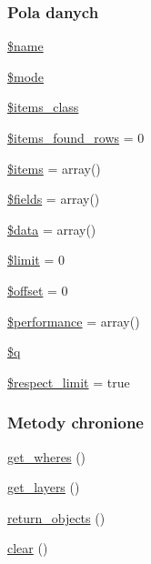 \subsubsection*{Pola danych}
\begin{DoxyCompactItemize}
\item 
\hyperlink{classep___dataset_ab2fc40d43824ea3e1ce5d86dee0d763b}{\$name}
\item 
\hyperlink{classep___dataset_a3aaf40baac36e278c7d7c9139df1750c}{\$mode}
\item 
\hyperlink{classep___dataset_aa6325e5d913d5f63195525aa6a082bc4}{\$items\-\_\-class}
\item 
\hyperlink{classep___dataset_a65539c516b1dfa0af15bb2bab190193b}{\$items\-\_\-found\-\_\-rows} = 0
\item 
\hyperlink{classep___dataset_a737abdef83dabb219182c1e88887c6c3}{\$items} = array()
\item 
\hyperlink{classep___dataset_ab2303c817e3b402b77b7f99627b9c319}{\$fields} = array()
\item 
\hyperlink{classep___dataset_a6efc15b5a2314dd4b5aaa556a375c6d6}{\$data} = array()
\item 
\hyperlink{classep___dataset_ae05862a0294251c88629b141b5ce329a}{\$limit} = 0
\item 
\hyperlink{classep___dataset_aec4de82415d7f05cb9748d12d3a95a87}{\$offset} = 0
\item 
\hyperlink{classep___dataset_a91d3d1509ebebbe642c6c820a752c75c}{\$performance} = array()
\item 
\hyperlink{classep___dataset_abb0f8f809252372e25f48d52b63ef29d}{\$q}
\item 
\hyperlink{classep___dataset_af679319b32be717b99242a2d66f04d71}{\$respect\-\_\-limit} = true
\end{DoxyCompactItemize}
\subsubsection*{Metody chronione}
\begin{DoxyCompactItemize}
\item 
\hyperlink{classep___dataset_a4cc7b151c094997a9a9f417875c14c43}{get\-\_\-wheres} ()
\item 
\hyperlink{classep___dataset_a1d545290ed264d2f541a325948faa153}{get\-\_\-layers} ()
\item 
\hyperlink{classep___dataset_a6e59d0e2fae50446d13d19e34bdeb49e}{return\-\_\-objects} ()
\item 
\hyperlink{classep___dataset_aa821bec12eaa7e0f649397c9675ff505}{clear} ()
\end{DoxyCompactItemize}
